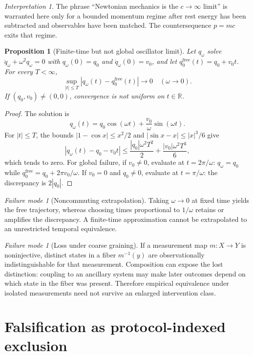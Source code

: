 \documentclass[11pt]{article}
\newtheorem{proposition}[definition]{Proposition}
\theoremstyle{remark}
\newtheorem{interpretation}[definition]{Interpretation}
\newtheorem{failuremode}[definition]{Failure mode}
\newcommand{\Real}{\mathbb{R}}
\begin{document}
\begin{interpretation}
The phrase ``Newtonian mechanics is the $c\to\infty$ limit'' is warranted here only for a bounded momentum regime after rest energy has been subtracted and observables have been matched.  The countersequence $p=mc$ exits that regime.
\end{interpretation}

\begin{proposition}[Finite-time but not global oscillator limit]\label{prop:osc-limit}
Let $q_\omega$ solve $\ddot q_\omega+\omega^2q_\omega=0$ with $q_\omega(0)=q_0$ and $\dot q_\omega(0)=v_0$, and let $q_0^{\mathrm{free}}(t)=q_0+v_0t$.  For every $T<\infty$,
\[
 \sup_{|t|\leq T}|q_\omega(t)-q_0^{\mathrm{free}}(t)|\to0
 \quad(\omega\to0).
\]
If $(q_0,v_0)\neq(0,0)$, convergence is not uniform on $t\in\Real$.
\end{proposition}
\begin{proof}
The solution is
\[
 q_\omega(t)=q_0\cos(\omega t)+\frac{v_0}{\omega}\sin(\omega t).
\]
For $|t|\leq T$, the bounds $|1-\cos x|\leq x^2/2$ and $|\sin x-x|\leq|x|^3/6$ give
\[
 |q_\omega(t)-q_0-v_0t|
 \leq \frac{|q_0|\omega^2T^2}{2}+\frac{|v_0|\omega^2T^3}{6},
\]
which tends to zero.  For global failure, if $v_0\neq0$, evaluate at $t=2\pi/\omega$: $q_\omega=q_0$ while $q_0^{\mathrm{free}}=q_0+2\pi v_0/\omega$.  If $v_0=0$ and $q_0\neq0$, evaluate at $t=\pi/\omega$: the discrepancy is $2|q_0|$.
\end{proof}

\begin{failuremode}[Noncommuting extrapolation]
Taking $\omega\to0$ at fixed time yields the free trajectory, whereas choosing times proportional to $1/\omega$ retains or amplifies the discrepancy.  A finite-time approximation cannot be extrapolated to an unrestricted temporal equivalence.
\end{failuremode}

\begin{failuremode}[Loss under coarse graining]
If a measurement map $m:X\to Y$ is noninjective, distinct states in a fiber $m^{-1}(y)$ are observationally indistinguishable for that measurement.  Composition can expose the lost distinction: coupling to an ancillary system may make later outcomes depend on which state in the fiber was present.  Therefore empirical equivalence under isolated measurements need not survive an enlarged intervention class.
\end{failuremode}

\section{Falsification as protocol-indexed exclusion}
\end{document}
